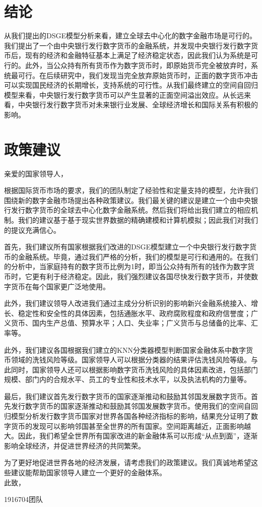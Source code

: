 \documentclass[withoutpreface,bwprint]{cumcmthesis} %
\begin{document}
\section{结论}
从我们提出的DSGE模型分析来看，建立全球去中心化的数字金融市场是可行的。我们提出了一个由中央银行发行数字货币的金融系统，并发现中央银行发行数字货币后，现有的经济和金融特征基本上满足了经济稳定状态，因此我们认为系统是可行的。此外，当公众持有所有货币作为数字货币时，即原始货币完全被放弃时，系统最可行。在后续研究中，我们发现当完全放弃原始货币时，正面的数字货币冲击可以实现国民经济的长期增长，支持系统的可行性。从我们最终建立的空间自回归模型来看，中央银行发行数字货币可以产生显著的正面空间溢出效应。从长远来看，中央银行发行数字货币对未来银行业发展、全球经济增长和国际关系有积极的影响。

\newpage

\section*{政策建议}
\noindent 亲爱的国家领导人，

根据国际货币市场的要求，我们的团队制定了经验性和定量支持的模型，允许我们围绕新的数字金融市场提出各种政策建议。我们最关键的建议是建立一个由中央银行发行数字货币的全球去中心化数字金融系统。然后我们将给出我们建立的相应机制。我们的建议基于基于现实世界数据的精确建模和计算机模拟；因此我们对我们的提议充满信心。

首先，我们建议所有国家根据我们改进的DSGE模型建立一个中央银行发行数字货币的金融系统。毕竟，通过我们严格的分析，我们的模型是可行和通用的。在我们的分析中，当家庭持有的数字货币比例为1时，即当公众持有所有的钱作为数字货币时，它更有利于经济稳定。因此，我们强烈建议各国尽快发行数字货币，并使数字货币在每个国家更广泛地使用。

此外，我们建议领导人改进我们通过主成分分析识别的影响新兴金融系统接入、增长、稳定性和安全性的具体因素，包括通胀水平、政府腐败程度和政府信誉度；广义货币、国内生产总值、预算水平；人口、失业率；广义货币与总储备的比率、汇率等。

此外，我们建议各国根据我们建立的KNN分类器模型判断国家金融体系中数字货币领域的洗钱风险等级。国家领导人可以根据分类器的结果评估洗钱风险等级。与此同时，国家领导人还可以根据影响数字货币洗钱风险的具体因素改进，包括部门规模、部门内的合规水平、员工的专业性和技术水平，以及执法机构的力量等。

最后，我们建议首先发行数字货币的国家逐渐推动和鼓励其邻国发展数字货币。首先发行数字货币的国家逐渐推动和鼓励其邻国发展数字货币。使用我们的空间自回归模型分析发行数字货币国家对世界各国各种经济指标的影响，结果充分证明了数字货币的发现可以影响邻国甚至全世界的所有国家。空间距离越近，正面影响越大。因此，我们希望全世界所有国家改进的新金融体系可以形成“从点到面”，逐渐影响全球经济，并促进世界经济的共同繁荣。

为了更好地促进世界各地的经济发展，请考虑我们的政策建议。我们真诚地希望这些建议能帮助国家领导人建立一个更好的金融体系。
\\

此致，

1916704团队

\newpage






\appendix


\end{document}
